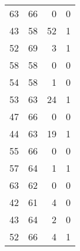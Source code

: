\begin{tabular}{rrrr}
 63 &  66 &  0 &  0 \\
 43 &  58 & 52 &  1 \\
 52 &  69 &  3 &  1 \\
 58 &  58 &  0 &  0 \\
 54 &  58 &  1 &  0 \\
 53 &  63 & 24 &  1 \\
 47 &  66 &  0 &  0 \\
 44 &  63 & 19 &  1 \\
 55 &  66 &  0 &  0 \\
 57 &  64 &  1 &  1 \\
 63 &  62 &  0 &  0 \\
 42 &  61 &  4 &  0 \\
 43 &  64 &  2 &  0 \\
 52 &  66 &  4 &  1 \\
\bottomrule
\end{tabular}
